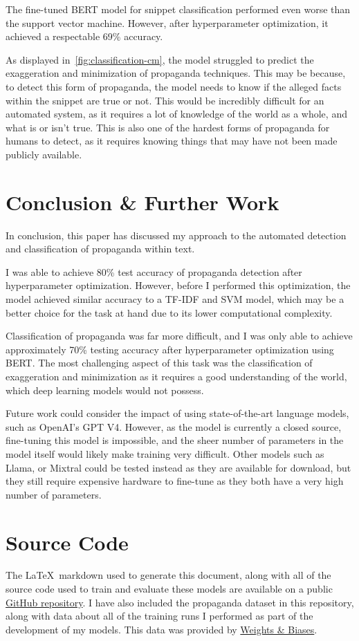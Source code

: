 \documentclass[twocolumn]{article}
\begin{document}
The fine-tuned BERT model for snippet classification performed even worse than the support vector machine. However, after hyperparameter optimization, it achieved a respectable 69\% accuracy. 

As displayed in~\autoref{fig:classification-cm}, the model struggled to predict the exaggeration and minimization of propaganda techniques. This may be because, to detect this form of propaganda, the model needs to know if the alleged facts within the snippet are true or not. This would be incredibly difficult for an automated system, as it requires a lot of knowledge of the world as a whole, and what is or isn't true. This is also one of the hardest forms of propaganda for humans to detect, as it requires knowing things that may have not been made publicly available.  

\section{Conclusion \& Further Work}

In conclusion, this paper has discussed my approach to the automated detection and classification of propaganda within text. 

I was able to achieve 80\% test accuracy of propaganda detection after hyperparameter optimization. However, before I performed this optimization, the model achieved similar accuracy to a TF-IDF and SVM model, which may be a better choice for the task at hand due to its lower computational complexity. 

Classification of propaganda was far more difficult, and I was only able to achieve approximately 70\% testing accuracy after hyperparameter optimization using BERT. The most challenging aspect of this task was the classification of exaggeration and minimization as it requires a good understanding of the world, which deep learning models would not possess. 

Future work could consider the impact of using state-of-the-art language models, such as OpenAI's GPT V4. However, as the model is currently a closed source, fine-tuning this model is impossible, and the sheer number of parameters in the model itself would likely make training very difficult. Other models such as Llama, or Mixtral could be tested instead as they are available for download, but they still require expensive hardware to fine-tune as they both have a very high number of parameters. 


\printbibliography

\appendix

\section*{Source Code}

The \LaTeX~markdown used to generate this document, along with all of the source code used to train and evaluate these models are available on a public \href{https://github.com/Henry-Ash-Williams/ANLE-Propaganda}{GitHub repository}. I have also included the propaganda dataset in this repository, along with data about all of the training runs I performed as part of the development of my models. This data was provided by \href{https://wandb.ai/}{Weights \& Biases}. 
\end{document}
